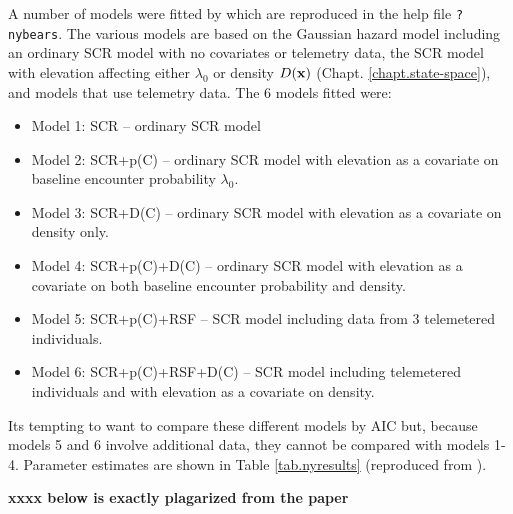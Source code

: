 A number of models were fitted by \citet{royle_etal:2012mee} which are
reproduced in the 
help file \mbox{\tt ?nybears}. The various models are 
 based on the Gaussian hazard model
including an ordinary SCR model with no covariates or telemetry data,
the SCR model with elevation affecting either $\lambda_{0}$ or density
$D({\bf x})$ (Chapt. \ref{chapt.state-space}), and models that use
telemetry data.  The 6 models fitted were:
\begin{itemize}
\item[] Model 1: SCR -- ordinary SCR model
\item[] Model 2: SCR+p(C) -- ordinary SCR model with elevation as a
  covariate on baseline encounter probability $\lambda_{0}$.
\item[] Model 3: SCR+D(C) -- ordinary SCR model with elevation as a
  covariate on density only.
\item[] Model 4: SCR+p(C)+D(C) -- ordinary SCR model with elevation as
  a covariate on both baseline encounter probability and density.
\item[] Model 5: SCR+p(C)+RSF -- SCR model including data from 3
  telemetered individuals.
\item[] Model 6: SCR+p(C)+RSF+D(C) -- SCR model including telemetered
  individuals and with elevation as a covariate on density.
\end{itemize}
Its tempting to want to compare these different models by AIC but,
because models 5 and 6 involve additional data, they cannot be
compared with models 1-4.
Parameter 
estimates are shown in Table \ref{tab.nyresults} (reproduced from
\citet{royle_etal:2012mee}).  



{\bf xxxx below is exactly plagarized from the paper}

